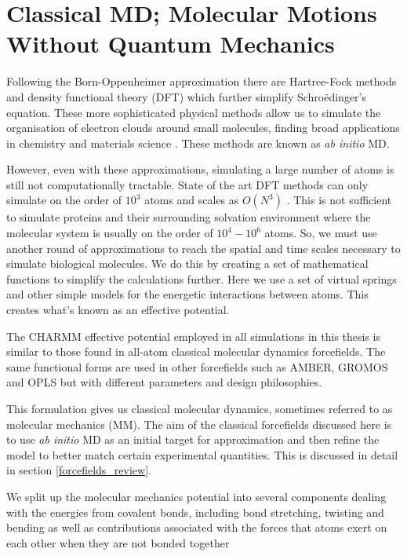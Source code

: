 \section{Classical MD; Molecular Motions Without Quantum Mechanics}
Following the Born-Oppenheimer approximation there are Hartree-Fock methods and density functional theory (DFT) which further simplify Schro\"edinger's equation. These more sophisticated physical methods allow us to simulate the organisation of electron clouds around small molecules, finding broad applications in chemistry and materials science \cite{vanmourik2014}. These methods are known as \textit{ab initio} MD. 

However, even with these approximations, simulating a large number of atoms is still not computationally tractable. State of the art DFT methods can only simulate on the order of $10^3$ atoms \cite{luo2020} and scales as $O(N^3)$ \cite{kresse1996}. This is not sufficient to simulate proteins and their surrounding solvation environment where the molecular system is usually on the order of $10^4-10^6$ atoms. So, we must use another round of approximations to reach the spatial and time scales necessary to simulate biological molecules. We do this by creating a set of mathematical functions to simplify the calculations further. Here we use a set of virtual springs and other simple models for the energetic interactions between atoms. This creates what's known as an effective potential. 


The CHARMM effective potential employed in all simulations in this thesis is similar to those found in all-atom classical molecular dynamics forcefields. The same functional forms are used in other forcefields such as AMBER, GROMOS and OPLS but with different parameters and design philosophies\cite{lemkul2020}. 

This formulation gives us classical molecular dynamics, sometimes referred to as molecular mechanics (MM). The aim of the classical forcefields discussed here is to use \textit {ab initio} MD as an initial target for approximation and then refine the model to better match certain experimental quantities. This is discussed in detail in section \ref{forcefields_review}.

We split up the molecular mechanics potential into several components dealing with the energies from covalent bonds, including bond stretching, twisting and bending as well as contributions associated with the forces that atoms exert on each other when they are not bonded together 

